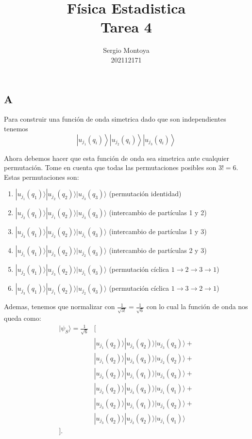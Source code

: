 \documentclass{report}
\title{\Huge{Física Estadistica}\\Tarea 4}
\author{\huge{Sergio Montoya} \\ 202112171}
\date{}
\begin{document}
\maketitle
\newpage%
\tableofcontents
\pagebreak

\chapter{}
\section{A}

Para construir una función de onda simetrica dado que son independientes tenemos
$$\left|u_{j_1}\left(q_i\right)\right>\left|u_{j_2}\left(q_i\right)\right>\left|u_{j_3}\left(q_i\right)\right>$$

Ahora debemos hacer que esta función de onda sea simetrica ante cualquier permutación. Tome en cuenta que todas las permutaciones posibles son $3! = 6$. Estas permutaciones son:
\begin{enumerate}
  \item $|u_{j_1}(q_1)\rangle |u_{j_2}(q_2)\rangle |u_{j_3}(q_3)\rangle$ (permutación identidad)
  \item $|u_{j_2}(q_1)\rangle |u_{j_1}(q_2)\rangle |u_{j_3}(q_3)\rangle$ (intercambio de partículas 1 y 2)
  \item $|u_{j_3}(q_1)\rangle |u_{j_2}(q_2)\rangle |u_{j_1}(q_3)\rangle$ (intercambio de partículas 1 y 3)
  \item $|u_{j_1}(q_1)\rangle |u_{j_3}(q_2)\rangle |u_{j_2}(q_3)\rangle$ (intercambio de partículas 2 y 3)
  \item $|u_{j_2}(q_1)\rangle |u_{j_3}(q_2)\rangle |u_{j_1}(q_3)\rangle$ (permutación cíclica $1 \rightarrow 2 \rightarrow 3 \rightarrow 1$)
  \item $|u_{j_3}(q_1)\rangle |u_{j_1}(q_2)\rangle |u_{j_2}(q_3)\rangle$ (permutación cíclica $1 \rightarrow 3 \rightarrow 2 \rightarrow 1$)
\end{enumerate}

Ademas, tenemos que normalizar con $\frac{1}{\sqrt{3!}} = \frac{1}{\sqrt{6}}$ con lo cual la función de onda nos queda como:
\begin{align*}
| \psi_S \rangle = \frac{1}{\sqrt{6}} &[\\
&| u_{j_1}(q_2) \rangle | u_{j_2}(q_2) \rangle | u_{j_3}(q_3) \rangle +\\
&| u_{j_1}(q_2) \rangle | u_{j_3}(q_3) \rangle | u_{j_2}(q_2) \rangle +\\
&| u_{j_2}(q_2) \rangle | u_{j_1}(q_1) \rangle | u_{j_3}(q_3) \rangle +\\
&| u_{j_2}(q_2) \rangle | u_{j_3}(q_3) \rangle | u_{j_1}(q_1) \rangle +\\
&| u_{j_3}(q_2) \rangle | u_{j_1}(q_1) \rangle | u_{j_2}(q_2) \rangle +\\
&| u_{j_3}(q_2) \rangle | u_{j_2}(q_2) \rangle | u_{j_1}(q_1) \rangle\\
].
\end{align*}
\end{document}

